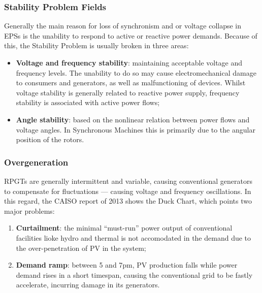 \documentclass[10pt, compress,xcolor={svgnames,dvipsnames,x11names}]{beamer}
\begin{document}
\begin{frame}%
\frametitle{Stability Problem Fields}

	Generally the main reason for loss of synchronism and or voltage collapse in EPSs is the unability to respond to active or reactive power demands. Because of this, the Stability Problem is usually broken in three areas:

\begin{itemize}
	\item \textbf{Voltage and frequency stability}: maintaining acceptable voltage and frequency levels. The unability to do so may cause electromechanical damage to consumers and generators, as well as malfunctioning of devices. Whilst voltage stability is generally related to reactive power supply, frequency stability is associated with active power flows;
%
	\item \textbf{Angle stability}: based on the nonlinear relation between power flows and voltage angles. In Synchronous Machines this is primarily due to the angular position of the rotors.
\end{itemize}
	
\end{frame}%

\begin{frame}%
\frametitle{Overgeneration}

	RPGTs are generally intermittent and variable, causing conventional generators to compensate for fluctuations --- causing voltage and frequency oscillations. In this regard, the CAISO report of 2013 shows the Duck Chart, which points two major problems:

\begin{enumerate}
	\item \textbf{Curtailment}: the minimal ``must-run'' power output of conventional facilities lioke hydro and thermal is not accomodated in the demand due to the over-penetration of PV in the system;
%
	\item \textbf{Demand ramp}: between 5 and 7pm, PV production falls while power demand rises in a short timespan, causing the conventional grid to be fastly accelerate, incurring damage in its generators.
\end{enumerate}

\end{frame}%
\end{document}
